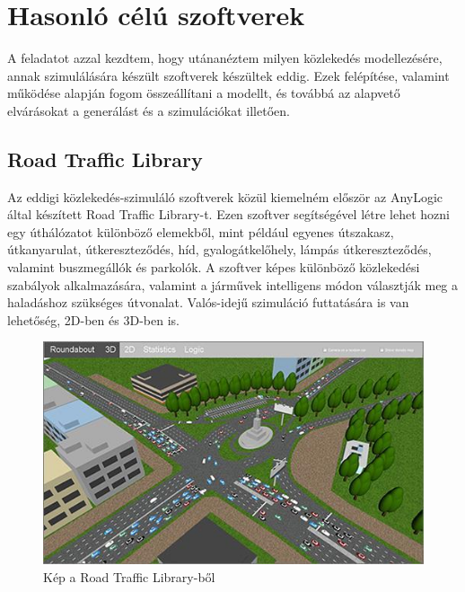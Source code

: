 ﻿

\section{Hasonló célú szoftverek}
A feladatot azzal kezdtem, hogy utánanéztem milyen közlekedés modellezésére, annak szimulálására készült szoftverek készültek eddig. Ezek felépítése, valamint működése alapján fogom összeállítani a modellt, és továbbá az alapvető elvárásokat a generálást és a szimulációkat illetően.
\subsection{Road Traffic Library}


Az eddigi közlekedés-szimuláló szoftverek közül kiemelném először az AnyLogic által készített Road Traffic Library-t. Ezen szoftver segítségével létre lehet hozni egy úthálózatot
különböző elemekből, mint például egyenes útszakasz, útkanyarulat, útkereszteződés, híd, gyalogátkelőhely, lámpás útkereszteződés, valamint buszmegállók és parkolók.
A szoftver képes különböző közlekedési szabályok alkalmazására, valamint a járművek intelligens módon választják meg a haladáshoz szükséges útvonalat.
Valós-idejű szimuláció futtatására is van lehetőség, 2D-ben és 3D-ben is. 
\begin{figure}[H]
\includegraphics[width=\linewidth]{RTL.png}
\caption{Kép a Road Traffic Library-ből}
\label{fig:RTL}
\end{figure}

